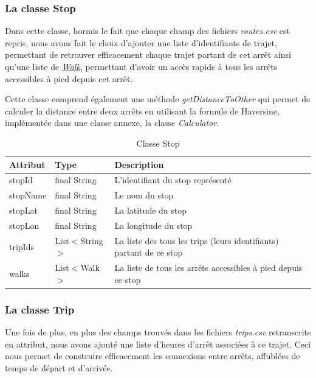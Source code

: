 \documentclass[12pt]{article}
\begin{document}
\subsubsection{La classe Stop}
\label{sec:stop}
Dans cette classe, hormis le fait que chaque champ des fichiers \emph{routes.csv} est repris, nous avons fait le choix d'ajouter
une liste d'identifiants de trajet, permettant de retrouver efficacement chaque trajet partant de cet arrêt ainsi qu'une liste de \hyperref[sec:walk]{\emph{Walk}}, permettant
d'avoir un accès rapide à tous les arrêts accessibles à pied depuis cet arrêt.

Cette classe comprend également une méthode \emph{getDistanceToOther} qui permet de calculer la distance entre deux arrêts en utilisant la formule de Haversine,
implémentée dans une classe annexe, la classe \emph{Calculator}.

\begin{table}[h]
    \centering
    \begin{tabular}{|l|l|p{8cm}|}
    \hline
    \textbf{Attribut} & \textbf{Type} & \textbf{Description} \\ \hline
    stopId & final String & L'identifiant du stop représenté \\ \hline
    stopName & final String & Le nom du stop \\ \hline
    stopLat & final String & La latitude du stop \\ \hline
    stopLon & final String & La longitude du stop \\ \hline
    tripIds & List$<$String$>$ & La liste des tous les trips (leurs identifiants) partant de ce stop \\ \hline
    walks & List$<$Walk$>$ & La liste de tous les arrêts accessibles à pied depuis ce stop \\ \hline
    \end{tabular}
    \caption{Classe Stop}
\end{table}

\subsubsection{La classe Trip}
\label{sec:trip}
Une fois de plus, en plus des champs trouvés dans les fichiers \emph{trips.csv} retranscrits en attribut, nous avons ajouté
une liste d'heures d'arrêt associées à ce trajet. Ceci nous permet de construire efficacement les connexions entre arrêts, affublées
de temps de départ et d'arrivée.
\end{document}
